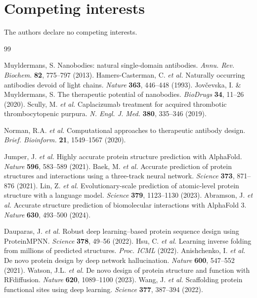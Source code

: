 \documentclass[11pt,a4paper]{article}
\begin{document}
\section*{Competing interests}
The authors declare no competing interests.

\begin{thebibliography}{99}

 Muyldermans, S. Nanobodies: natural single-domain antibodies. \textit{Annu. Rev. Biochem.} \textbf{82}, 775--797 (2013).
 Hamers-Casterman, C. \textit{et al.} Naturally occurring antibodies devoid of light chains. \textit{Nature} \textbf{363}, 446--448 (1993).
 Jov{\v{c}}evska, I. \& Muyldermans, S. The therapeutic potential of nanobodies. \textit{BioDrugs} \textbf{34}, 11--26 (2020).
 Scully, M. \textit{et al.} Caplacizumab treatment for acquired thrombotic thrombocytopenic purpura. \textit{N. Engl. J. Med.} \textbf{380}, 335--346 (2019).

 Norman, R.A. \textit{et al.} Computational approaches to therapeutic antibody design. \textit{Brief. Bioinform.} \textbf{21}, 1549--1567 (2020).

 Jumper, J. \textit{et al.} Highly accurate protein structure prediction with AlphaFold. \textit{Nature} \textbf{596}, 583--589 (2021).
 Baek, M. \textit{et al.} Accurate prediction of protein structures and interactions using a three-track neural network. \textit{Science} \textbf{373}, 871--876 (2021).
 Lin, Z. \textit{et al.} Evolutionary-scale prediction of atomic-level protein structure with a language model. \textit{Science} \textbf{379}, 1123--1130 (2023).
 Abramson, J. \textit{et al.} Accurate structure prediction of biomolecular interactions with AlphaFold 3. \textit{Nature} \textbf{630}, 493--500 (2024).

 Dauparas, J. \textit{et al.} Robust deep learning--based protein sequence design using ProteinMPNN. \textit{Science} \textbf{378}, 49--56 (2022).
 Hsu, C. \textit{et al.} Learning inverse folding from millions of predicted structures. \textit{Proc. ICML} (2022).
 Anishchenko, I. \textit{et al.} De novo protein design by deep network hallucination. \textit{Nature} \textbf{600}, 547--552 (2021).
 Watson, J.L. \textit{et al.} De novo design of protein structure and function with RFdiffusion. \textit{Nature} \textbf{620}, 1089--1100 (2023).
 Wang, J. \textit{et al.} Scaffolding protein functional sites using deep learning. \textit{Science} \textbf{377}, 387--394 (2022).


\end{thebibliography}
\end{document}
